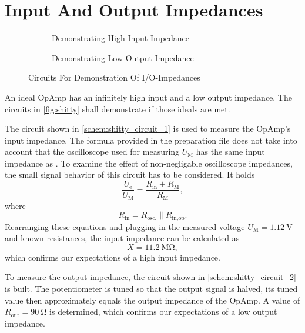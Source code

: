 \section{Input And Output Impedances}
\begin{figure}[tbp]
	\centering
	\begin{subfigure}{0.4\textwidth}
		\centering
		\caption{Demonstrating High Input Impedance}
		\label{schem:shitty_circuit_1}
	\end{subfigure}
	\begin{subfigure}{0.4\textwidth}
		\centering
		\caption{Demonstrating Low Output Impedance}
		\label{schem:shitty_circuit_2}
	\end{subfigure}
	\caption{Circuits For Demonstration Of I/O-Impedances}
	\label{fig:shitty}
\end{figure}
An ideal OpAmp has an infinitely high input and a low output impedance.
The circuits in \autoref{fig:shitty} shall demonstrate if those ideals are met.

The circuit shown in \autoref{schem:shitty_circuit_1} is used to measure the OpAmp's input impedance.
The formula provided in the preparation file does not take into account that the oscilloscope used for measuring $U_\text{M}$ has the same input impedance as .
To examine the effect of non-negligable oscilloscope impedances, the small signal behavior of this circuit has to be considered.
It holds
\begin{equation*}
	\frac{U_\text{e}}{U_\text{M}}=\frac{R_\text{in}+R_\text{M}}{R_\text{M}},
\end{equation*}
where
\begin{equation*}
	R_\text{in}=R_\text{osc.}\| R_\text{in,op}.
\end{equation*}
Rearranging these equations and plugging in the measured voltage $U_\text{M}=\SI{1.12}{\volt}$ and known resistances, the input impedance can be calculated as
\begin{equation*}
	X=\SI{11.2}{\mega\ohm},
\end{equation*}
which confirms our expectations of a high input impedance.

To measure the output impedance, the circuit shown in \autoref{schem:shitty_circuit_2} is built.
The potentiometer is tuned so that the output signal is halved, its tuned value then approximately equals the output impedance of the OpAmp.
A value of $R_\text{out}=\SI{90}{\ohm}$ is determined, which confirms our expectations of a low output impedance.

